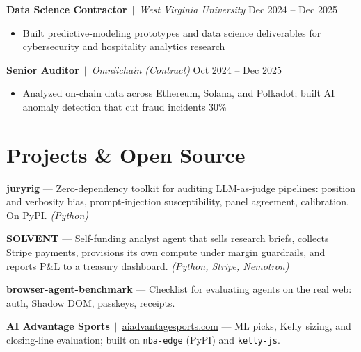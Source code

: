 \documentclass[10pt,letterpaper]{article}
\newcommand{\resumeitem}[1]{\item[\textbullet] #1}
\newcommand{\role}[4]{\textbf{#1} \,$\vert$\, \textit{#2} \hfill #3}
\begin{document}
\vspace{2pt}

\role{Data Science Contractor}{West Virginia University}{Dec 2024 -- Dec 2025}{Morgantown, WV}
\begin{itemize}[nosep, leftmargin=16pt, topsep=2pt]
    \resumeitem{Built predictive-modeling prototypes and data science deliverables for cybersecurity and hospitality analytics research}
\end{itemize}

\vspace{2pt}

\role{Senior Auditor}{Omniichain (Contract)}{Oct 2024 -- Dec 2025}{Hybrid}
\begin{itemize}[nosep, leftmargin=16pt, topsep=2pt]
    \resumeitem{Analyzed on-chain data across Ethereum, Solana, and Polkadot; built AI anomaly detection that cut fraud incidents 30\%}
\end{itemize}

\section{Projects \& Open Source}

\textbf{\href{https://github.com/ianalloway/juryrig}{juryrig}} --- Zero-dependency toolkit for auditing LLM-as-judge pipelines: position and verbosity bias, prompt-injection susceptibility, panel agreement, calibration. On PyPI. \textit{(Python)}

\vspace{1pt}

\textbf{\href{https://github.com/ianalloway/solvent-agent}{SOLVENT}} --- Self-funding analyst agent that sells research briefs, collects Stripe payments, provisions its own compute under margin guardrails, and reports P\&L to a treasury dashboard. \textit{(Python, Stripe, Nemotron)}

\vspace{1pt}

\textbf{\href{https://allowayai.substack.com/p/the-browser-is-the-real-agent-benchmark}{browser-agent-benchmark}} --- Checklist for evaluating agents on the real web: auth, Shadow DOM, passkeys, receipts.

\vspace{1pt}

\textbf{AI Advantage Sports} \,$\vert$\, \href{https://aiadvantagesports.com}{aiadvantagesports.com} --- ML picks, Kelly sizing, and closing-line evaluation; built on \texttt{nba-edge} (PyPI) and \texttt{kelly-js}.
\end{document}
